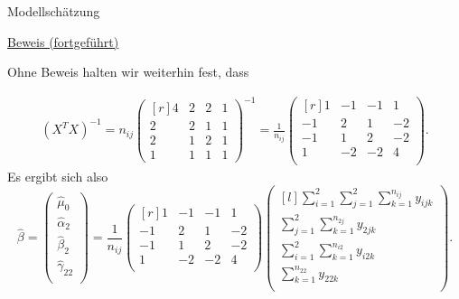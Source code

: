\documentclass[
  8pt,
  ignorenonframetext,
]{beamer}
\begin{document}
\begin{frame}{Modellschätzung}
\protect\hypertarget{modellschuxe4tzung-10}{}
\footnotesize
\vspace{1mm}

\underline{Beweis (fortgeführt)}

Ohne Beweis halten wir weiterhin fest, dass

\begin{align}
(X^T X)^{-1}
=
n_{ij}
\begin{pmatrix*}[r]
4 & 2 & 2 & 1 \\
2 & 2 & 1 & 1 \\
2 & 1 & 2 & 1 \\
1 & 1 & 1 & 1
\end{pmatrix*}^{-1}
=
\frac{1}{n_{ij}}
\begin{pmatrix*}[r]
 1 & -1 & -1 &  1 \\
-1 &  2 &  1 & -2 \\
-1 &  1 &  2 & -2 \\
 1 & -2 & -2 &  4 \\
\end{pmatrix*}.
\end{align} Es ergibt sich also \begin{equation}
\hat{\beta}
=
\begin{pmatrix}
\hat{\mu}_0      \\
\hat{\alpha}_2   \\
\hat{\beta}_2    \\
\hat{\gamma}_{22} \\
\end{pmatrix}
=
\frac{1}{n_{ij}}
\begin{pmatrix*}[r]
 1 & -1 & -1 &  1 \\
-1 &  2 &  1 & -2 \\
-1 &  1 &  2 & -2 \\
 1 & -2 & -2 &  4 \\
\end{pmatrix*}
\begin{pmatrix*}[l]
\sum_{i=1}^2 \sum_{j=1}^2 \sum_{k = 1}^{n_{ij}} y_{ijk}     \\
\sum_{j=1}^2 \sum_{k = 1}^{n_{2j}} y_{2jk}                  \\
\sum_{i=1}^2 \sum_{k = 1}^{n_{i2}} y_{i2k}                  \\
\sum_{k = 1}^{n_{22}} y_{22k}                               \\
\end{pmatrix*}.
\end{equation}
\end{frame}
\end{document}
